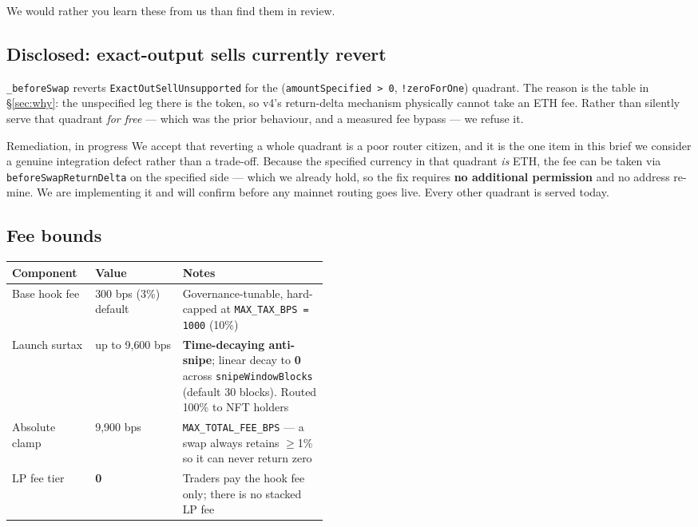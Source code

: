 \documentclass[11pt,a4paper]{article}
\newcommand{\code}[1]{\texttt{\small #1}}
\begin{document}
We would rather you learn these from us than find them in review.

\subsection{Disclosed: exact-output sells currently revert}

\code{\_beforeSwap} reverts \code{ExactOutSellUnsupported} for the
(\code{amountSpecified > 0}, \code{!zeroForOne}) quadrant. The reason is the table
in \S\ref{sec:why}: the unspecified leg there is the token, so v4's return-delta
mechanism physically cannot take an ETH fee. Rather than silently serve that
quadrant \emph{for free} --- which was the prior behaviour, and a measured fee
bypass --- we refuse it.

\begin{plainbox}{Remediation, in progress}
We accept that reverting a whole quadrant is a poor router citizen, and it is the
one item in this brief we consider a genuine integration defect rather than a
trade-off. Because the specified currency in that quadrant \emph{is} ETH, the fee
can be taken via \code{beforeSwapReturnDelta} on the specified side --- which we
already hold, so the fix requires \textbf{no additional permission} and no
address re-mine. We are implementing it and will confirm before any mainnet
routing goes live. Every other quadrant is served today.
\end{plainbox}

\subsection{Fee bounds}

\begin{center}\small
\begin{tabular}{@{}llp{0.46\linewidth}@{}}
\toprule
\textbf{Component} & \textbf{Value} & \textbf{Notes} \\
\midrule
Base hook fee & 300 bps (3\%) default & Governance-tunable, hard-capped at \code{MAX\_TAX\_BPS = 1000} (10\%) \\
Launch surtax & up to 9{,}600 bps & \textbf{Time-decaying anti-snipe}; linear decay to \textbf{0} across \code{snipeWindowBlocks} (default 30 blocks). Routed 100\% to NFT holders \\
Absolute clamp & 9{,}900 bps & \code{MAX\_TOTAL\_FEE\_BPS} --- a swap always retains $\geq$1\% so it can never return zero \\
LP fee tier & \textbf{0} & Traders pay the hook fee only; there is no stacked LP fee \\
\bottomrule
\end{tabular}
\end{center}
\end{document}
